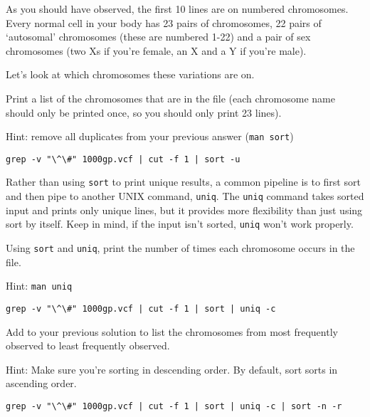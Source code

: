 \begin{note}
As you should have observed, the first 10 lines are on numbered chromosomes. Every normal cell in your body has 23 pairs of chromosomes, 22 pairs of `autosomal' chromosomes (these are numbered 1-22) and a pair of sex chromosomes (two Xs if you're female, an X and a Y if you're male).

Let's look at which chromosomes these variations are on. 

\end{note}
\begin{questions}
Print a list of the chromosomes that are in the file (each chromosome name should only be printed once, so you should only print 23 lines).

Hint: remove all duplicates from your previous answer (\texttt{man sort})
\begin{answer}
\begin{lstlisting}
grep -v "\^\#" 1000gp.vcf | cut -f 1 | sort -u
\end{lstlisting}
\end{answer}
\end{questions}

\begin{note}
Rather than using \texttt{sort} to print unique results, a common pipeline is to first sort and then pipe to another UNIX command, \texttt{uniq}. The \texttt{uniq} command takes sorted input and prints only unique lines, but it provides more flexibility than just using sort by itself. Keep in mind, if the input isn't sorted, \texttt{uniq} won't work properly.
\end{note}

\begin{questions}
Using \texttt{sort} and \texttt{uniq}, print the number of times each chromosome occurs in the file.

Hint: \texttt{man uniq}
\begin{answer}
\begin{lstlisting}
grep -v "\^\#" 1000gp.vcf | cut -f 1 | sort | uniq -c
\end{lstlisting}
\end{answer}
Add to your previous solution to list the chromosomes from most frequently observed to least frequently observed.

Hint: Make sure you're sorting in descending order. By default, sort sorts in ascending order.
\begin{answer}
\begin{lstlisting}
grep -v "\^\#" 1000gp.vcf | cut -f 1 | sort | uniq -c | sort -n -r
\end{lstlisting}
\end{answer}
\end{questions}


